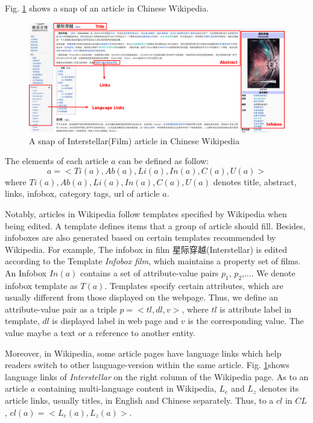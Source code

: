 \documentclass[runningheads,a4paper]{llncs}
\begin{document}
Fig. \ref{fig:interstellar} shows a snap of an article in Chinese Wikipedia.
\begin{figure}[ht]
    \centerline{\includegraphics[width=1\columnwidth]{fig/interstellar}}
    \caption{A snap of Interstellar(Film) article in Chinese Wikipedia}
    \label{fig:interstellar}
\end{figure}%

The elements of each article $a$ can be defined as follow:
\begin{equation}
    a = <Ti(a),Ab(a),Li(a),In(a),C(a),U(a)>
\end{equation}
where $Ti(a),Ab(a),Li(a),In(a),C(a),U(a)$ denotes title, abstract, links, infobox, category tags, url of article $a$.

Notably, articles in Wikipedia follow templates specified by Wikipedia when being edited. A template defines items that a group of article should fill. Besides, infoboxes are also generated based on certain templates recommended by Wikipedia. For example, The infobox in film 星际穿越(Interstellar) is edited according to the Template \emph{Infobox film}, which maintains a property set of films. An Infobox $In(a)$ contains a set of attribute-value pairs {$p_{1}$, $p_{2}$,...}. We denote infobox template as $T(a)$. Templates specify certain attributes, which are usually different from those displayed on the webpage. Thus, we define an attribute-value pair as a triple $p=<tl,dl,v>$, where $tl$ is attribute label in template, $dl$ is displayed label in web page and $v$ is the corresponding value. The value maybe a text or a reference to another entity.

Moreover, in Wikipedia, some article pages have language links which help readers switch to other language-version within the same article. Fig. \ref{fig:interstellar}shows language links of \emph{Interstellar} on the right column of the Wikipedia page. As to an article $a$ containing multi-language content in Wikipedia, $L_{e}$ and $L_{z}$ denotes its article links, usually titles, in English and Chinese separately. Thus, to a $cl$ in $CL$, $cl(a) = <L_{e}(a), L_{z}(a)>$.
\end{document}
